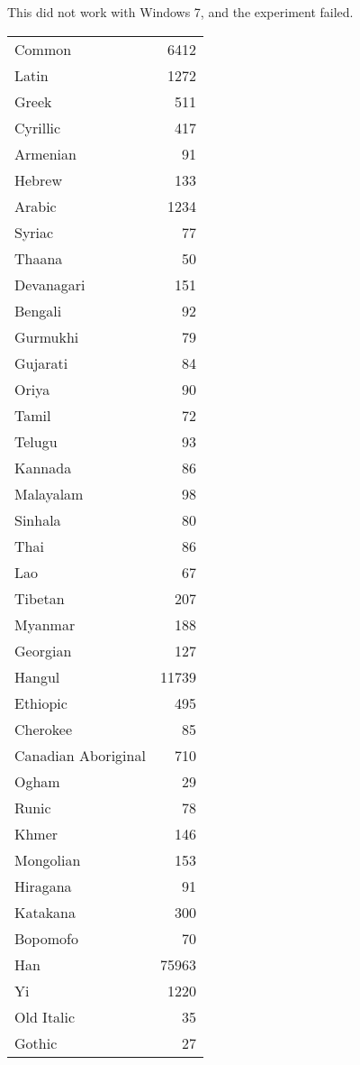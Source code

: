  	
This did not work with Windows 7, and the experiment failed. 









\arial
\begin{longtable}{lr}
Common	&6412\\
Latin	&1272\\
Greek	&511\\
Cyrillic	&417\\
Armenian	&91\\
Hebrew	 &133\\
Arabic	 &1234\\
Syriac	 &77\\
Thaana	 &50\\
Devanagari	&151\\
Bengali	&92\\
Gurmukhi	&79\\
Gujarati	&84\\
Oriya	&90\\
Tamil	&72\\
Telugu	&93\\
Kannada	&86\\
Malayalam	&98\\
Sinhala	&80\\
Thai	&86\\
Lao	 &67\\
Tibetan	&207\\
Myanmar	&188\\
Georgian	&127\\
Hangul	   &11739\\
Ethiopic	&495\\
Cherokee	&85\\
Canadian Aboriginal	 &710\\
Ogham	&29\\
Runic	&78\\
Khmer	&146\\
Mongolian	&153\\
Hiragana	&91\\
Katakana	&300\\
Bopomofo	&70\\
Han	 &75963\\
Yi	&1220\\
Old Italic	&35\\
Gothic	 &27\\

\end{longtable}
